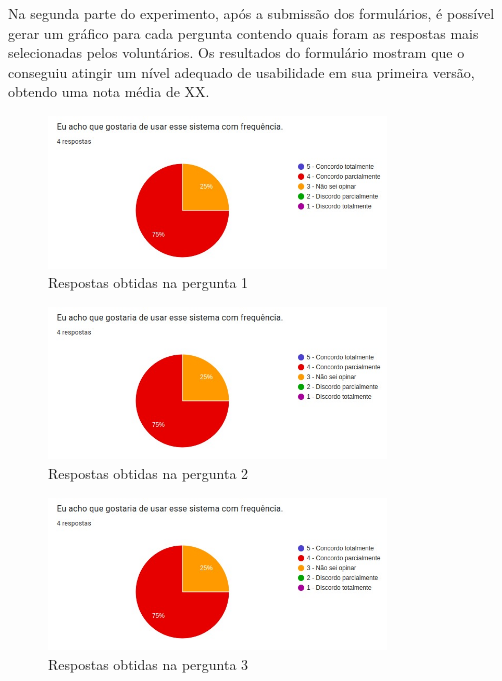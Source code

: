 \documentclass[12pt]{tcc}
\begin{document}
	Na segunda parte do experimento, após a submissão dos formulários, é possível gerar um gráfico para cada pergunta contendo quais foram as respostas mais selecionadas pelos voluntários. Os resultados do formulário mostram que o  conseguiu atingir um nível adequado de usabilidade em sua primeira versão, obtendo uma nota média de XX.




	\begin{figure}[!ht]
		\centering
		\includegraphics[width=0.8\textwidth]{figures/respostas-pergunta-1.jpeg}
		\caption{Respostas obtidas na pergunta 1}
		\label{fig:respostas-pergunta-1}
	\end{figure}

	\pagebreak

	\begin{figure}[!ht]
		\centering
		\includegraphics[width=0.8\textwidth]{figures/respostas-pergunta-2.jpeg}
		\caption{Respostas obtidas na pergunta 2}
		\label{fig:respostas-pergunta-2}
	\end{figure}

	\begin{figure}[!ht]
		\centering
		\includegraphics[width=0.8\textwidth]{figures/respostas-pergunta-3.jpeg}
		\caption{Respostas obtidas na pergunta 3}
		\label{fig:respostas-pergunta-3}
	\end{figure}
\end{document}
